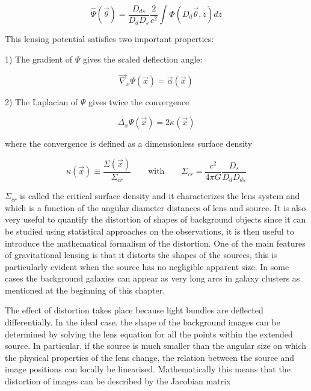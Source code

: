 \begin{equation}
\hat{\Psi}(\vec{\theta})=\frac{D_{ds}}{D_{d}D_{s}}\frac{2}{c^{2}}\int\Phi(D_{d}\vec{\theta},z)dz
\end{equation}

This lensing potential satisfies two important properties:

1) The gradient of $\Psi$ gives the scaled deflection angle:

\begin{equation}
\vec{\nabla}_{x}\Psi(\vec{x})=\vec{\alpha}(\vec{x})
\end{equation}

2) The Laplacian of $\Psi$ gives twice the convergence

\begin{equation}
\Delta_{x}\Psi(\vec{x})=2\kappa(\vec{x})
\end{equation}

where the convergence is defined as a dimensionless surface density

\begin{equation}
\kappa(\vec{x})\equiv \frac{\Sigma(\vec{x})}{\Sigma_{cr}}\qquad \text{with} \qquad \Sigma_{cr}=\frac{c^{2}}{4\pi G}\frac{D_s}{D_d D_{ds}}
\end{equation}

$\Sigma_{cr}$ is called the critical surface density and it characterizes the lens system and which is a function of the angular diameter distances of lens and source. It is also very useful to quantify the distortion of shapes of background objects since it can be studied using statistical approaches on the observations, it is then useful to introduce the mathematical formalism of the distortion. One of the main features of gravitational lensing is that it distorts the shapes of the sources, this is particularly evident when the source has no negligible apparent size. In some cases the background galaxies can appear as very long arcs in galaxy clusters as mentioned at the beginning of this chapter. 

The effect of distortion takes place because light bundles are deflected differentially. In the ideal case, the shape of the background images can be determined by solving the lens equation for all the points within the extended source. In particular, if the source is much smaller than the angular size on which the physical properties of the lens change, the relation between the source and image positions can locally be linearised. Mathematically this means that the distortion of images can be described by the Jacobian matrix

